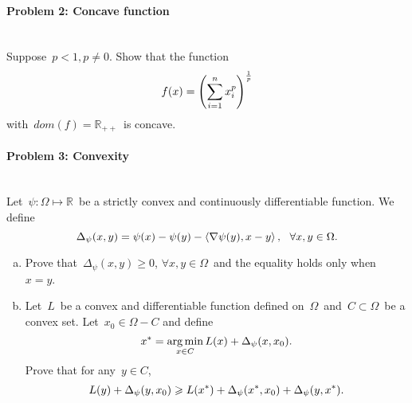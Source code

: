 \documentclass[a4paper]{article}
\newenvironment{solution}
{\color{blue} \paragraph{Solution.}}
{\newline \qed}
\begin{document}
\paragraph{Problem 2: Concave function}
~\\

\noindent
Suppose~$p < 1, p \neq 0$. Show that the function
\begin{equation}
f(x) = \left( \sum^n_{i=1} x^p_i \right)^{\frac{1}{p}} \notag
\end{equation}
with~$dom(f) = \mathbb{R}_{++}$~is concave.




\paragraph{Problem 3: Convexity}
~\\

\noindent
Let~$\psi : \Omega \mapsto \mathbb{R}$~be a strictly convex and continuously differentiable function. We define
\begin{equation}
\Delta_{\psi} (x, y) = \psi(x) - \psi(y) - \Braket{\nabla \psi(y), x - y}, ~~\forall x, y \in \Omega. \notag
\end{equation}

\begin{enumerate}[a)]
    \item Prove that~$\Delta_{\psi}(x, y) \geqslant 0$, $\forall x, y \in \Omega$~and the equality holds only when~$x = y$.
    
    \item Let~$L$~be a convex and differentiable function defined on~$\Omega$~and~$C \subset \Omega$~be a convex set. 
    Let~$x_0 \in \Omega - C$ and define
    \begin{equation}
        x^* = \mathop{\arg\min}\limits_{x \in C} L(x) + \Delta_{\psi} (x, x_0). \notag
    \end{equation}
    Prove that for any~$y \in C$,
    \begin{equation}
        L(y) + \Delta_{\psi}(y, x_0) \geqslant L(x^*) + \Delta_{\psi} (x^*, x_0) + \Delta_{\psi} (y, x^*). \notag
    \end{equation}
\end{enumerate}

\end{document}
